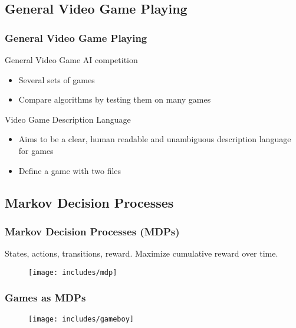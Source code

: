 \documentclass[aspectratio=169]{beamer}
\begin{document}
\subsection{General Video Game Playing}
\begin{frame}
	\frametitle{General Video Game Playing \cite{perez2014, schaul2013video}}
	\begin{block}{General Video Game AI competition}
		\begin{itemize}
			\item Several sets of games
			\item Compare algorithms by testing them on many games
		\end{itemize}
	\end{block}
	\begin{block}{Video Game Description Language}
		\begin{itemize}
			\item Aims to be a clear, human readable and unambiguous
				description language for games
			\item Define a game with two files
		\end{itemize}
	\end{block}
\end{frame}

\subsection{Markov Decision Processes}
\begin{frame}
	\frametitle{Markov Decision Processes (MDPs) \cite{sutton1998reinforcement}}
	States, actions, transitions, reward. Maximize cumulative reward over time.
	\begin{figure}
	\centering
	\texttt{[image: includes/mdp]}
	\end{figure}
\end{frame}
\begin{frame}
	\frametitle{Games as MDPs}
	\begin{figure}
	\centering
	\texttt{[image: includes/gameboy]}
	\end{figure}
\end{frame}
\end{document}
